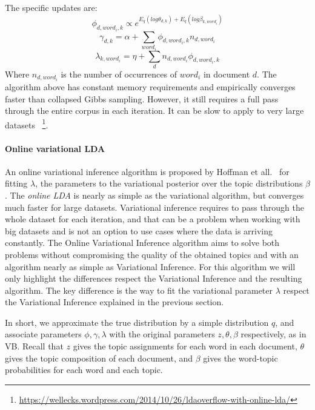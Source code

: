 \documentclass[12pt]{report}
\begin{document}
The specific updates are:
\begin{equation}
\phi_{d,word_{i},k} \propto e^{E_{q}(log \theta_{d,k})+E_{q}(log\beta_{k,word_{i}})}
\end{equation}
\begin{equation}
\gamma_{d,k} = \alpha + \sum_{word_{i}}\phi_{d,word_{i},k}n_{d,word_{i}}
\end{equation}
\begin{equation}
\lambda_{k,word_{i}}=\eta +\sum_{d}n_{d,word_{i}}\phi_{d,word_{i},k}
\end{equation}
Where $n_{d,word_{i}}$ is the number of occurrences of $word_{i}$ in
document $d$. The algorithm above has constant memory requirements and
empirically converges faster than collapsed Gibbs sampling. However,
it still requires a full pass through the entire corpus in each
iteration. It can be slow to apply to very large datasets
~\footnote{\url{https://wellecks.wordpress.com/2014/10/26/ldaoverflow-with-online-lda/}}.

\paragraph{Online variational LDA}
\label{oLDAvb}
An online variational inference algorithm is proposed by Hoffman et all.~\cite{onlineLDAvb} for fitting $\lambda$, the parameters to the variational
posterior over the topic distributions $\beta$. The \emph{online LDA} is nearly as
simple as the variational algorithm, but converges much faster for large
datasets. Variational inference requires to pass through the whole dataset for
each iteration, and that can be a problem when working with big datasets and is
not an option to use cases where the data is arriving constantly. The Online
Variational Inference algorithm aims to solve both problems without compromising
the quality of the obtained topics and with an algorithm nearly as simple as
Variational Inference. For this algorithm we will only highlight the differences
respect the Variational Inference and the resulting algorithm. The key
difference is the way to fit the variational parameter $\lambda$ respect the
Variational Inference explained in the previous section.

In short, we approximate the true distribution by a simple distribution $q$, and
associate parameters $\phi,\gamma,\lambda$ with the original parameters $z,\theta,
\beta$ respectively, as in VB. Recall that $z$ gives the topic assignments for each
word in each document, $\theta$ gives the topic composition of each document, 
and $\beta$ gives the word-topic probabilities for each word and each topic.
\end{document}
